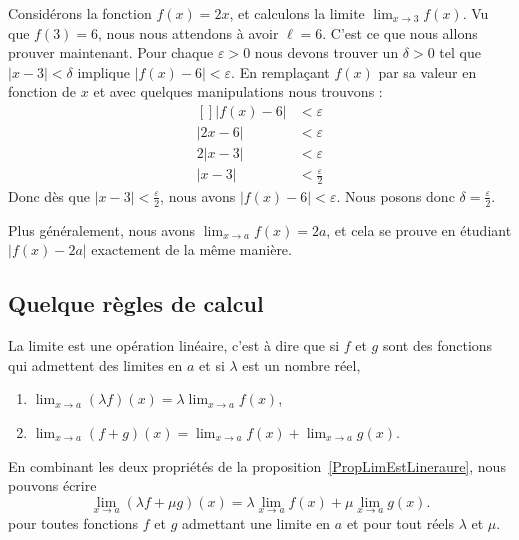 \begin{example}
	Considérons la fonction $f(x)=2x$, et calculons la limite $\lim_{x\to 3} f(x)$. Vu que $f(3)=6$, nous nous attendons à avoir $\ell=6$. C'est ce que nous allons prouver maintenant. Pour chaque $\varepsilon>0$ nous devons trouver un $\delta>0$ tel que $| x-3 |<\delta$ implique $| f(x)-6 |<\varepsilon$. En remplaçant $f(x)$ par sa valeur en fonction de $x$ et avec quelques manipulations nous trouvons :
	\begin{equation}
		\begin{aligned}[]
			| f(x)-6 |&<\varepsilon\\
			| 2x-6 |&<\varepsilon\\
			2| x-3 |&<\varepsilon\\
			| x-3 |&<\frac{ \varepsilon }{2}
		\end{aligned}
	\end{equation}
	Donc dès que $| x-3 |<\frac{ \varepsilon }{2}$, nous avons $| f(x)-6 |<\varepsilon$. Nous posons donc $\delta=\frac{ \varepsilon }{2}$.

	Plus généralement, nous avons $\lim_{x\to a} f(x)=2a$, et cela se prouve en étudiant $| f(x)-2a |$ exactement de la même manière.
\end{example}

\subsection{Quelque règles de calcul}

\begin{proposition}	\label{PropLimEstLineraure}
	La limite est une opération linéaire, c'est à dire que si $f$ et $g$ sont des fonctions qui admettent des limites en $a$ et si $\lambda$ est un nombre réel,
	\begin{enumerate}

		\item
			$\lim_{x\to a} (\lambda f)(x)=\lambda\lim_{x\to a} f(x)$,
		\item
			$\lim_{x\to a} (f+g)(x)=\lim_{x\to a} f(x)+\lim_{x\to a} g(x)$.
	\end{enumerate}
\end{proposition}
En combinant les deux propriétés de la proposition~\ref{PropLimEstLineraure}, nous pouvons écrire
\begin{equation}
	\lim_{x\to a} (\lambda f+\mu g)(x)=\lambda\lim_{x\to a} f(x)+\mu\lim_{x\to a} g(x).
\end{equation}
pour toutes fonctions $f$ et $g$ admettant une limite en $a$ et pour tout réels $\lambda$ et $\mu$.


